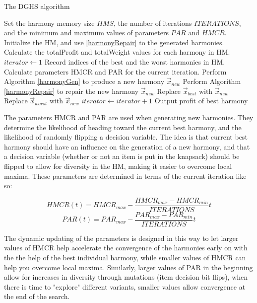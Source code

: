 \documentclass[titlepage]{article}
\begin{document}
\begin{breakablealgorithm}
\caption{The DGHS algorithm}\label{DGHS}
    \begin{algorithmic}[1]
        \State Set the harmony memory size $HMS$, the number of iterations $ITERATIONS$, and the minimum and maximum values of parameters $PAR$ and $HMCR$.
        \State Initialize the HM, and use \ref{harmonyRepair} to the generated harmonies. Calculate the totalProfit and totalWeight values for each harmony in HM.
        \State $iterator \gets 1$
            \State Record indices of the best and the worst harmonies in HM.
            \State Calculate parameters HMCR and PAR for the current iteration.
            \State Perform Algorithm \ref{harmonyGen} to produce a new harmony $\Vec{x}_{new}$
            \State Perform Algorithm \ref{harmonyRepair} to repair the new harmony $\Vec{x}_{new}$
                \State Replace $\Vec{x}_{best} \text{ with } \Vec{x}_{new}$
                \State Replace $\Vec{x}_{worst} \text{ with } \Vec{x}_{new}$
            \EndIf
            \State $iterator \gets iterator+1$
        \EndWhile
        \State Output profit of best harmony
    \end{algorithmic}
\end{breakablealgorithm}

The parameters HMCR and PAR are used when generating new harmonies. They determine the likelihood of heading toward the current best harmony, and the likelihood of randomly flipping a decision variable. The idea is that current best harmony should have an influence on the generation of a new harmony, and that a decision variable (whether or not an item is put in the knapsack) should be flipped to allow for diversity in the HM, making it easier to overcome local maxima. These parameters are determined in terms of the current iteration like so:

\begin{equation}
    HMCR(t) = HMCR_{max} - \frac{HMCR_{max}-HMCR_{min}}{ITERATIONS} t
\end{equation}
\begin{equation}
    PAR(t) = PAR_{max} - \frac{PAR_{max}-PAR_{min}}{ITERATIONS} t
\end{equation}

The dynamic updating of the parameters is designed in this way to let larger values of HMCR help accelerate the convergence of the harmonies early on with the the help of the best individual harmony, while smaller values of HMCR can help you overcome local maxima. Similarly, larger values of PAR in the beginning allow for increases in diversity through mutations (item decision bit flips), when there is time to "explore" different variants, smaller values allow convergence at the end of the search. 
\end{document}
